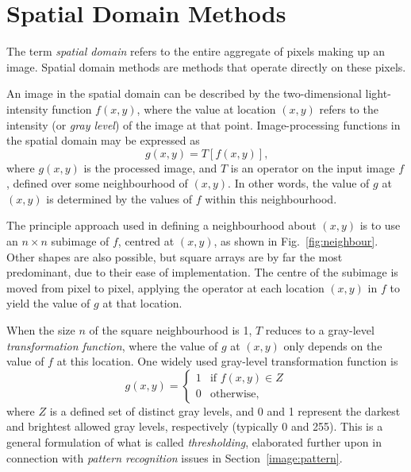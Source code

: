 
\section{Spatial Domain Methods}
\label{image:spatial}

The term {\em spatial domain\/} refers to the entire aggregate of
pixels making up an image.  Spatial domain methods are methods that
operate directly on these pixels.

An image in the spatial domain can be described by the two-dimensional
light-intensity function $f(x,y)$, where the value at location $(x,y)$
refers to the intensity (or {\em gray level\/}) of the image at that
point.  Image-processing functions in the spatial domain may be
expressed as
\begin{equation}
\label{eq:spatial_operator}
g(x,y)=T[f(x,y)]\mbox{,}
\end{equation}
where $g(x,y)$ is the processed image, and $T$ is an operator on the
input image $f$, defined over some neighbourhood of $(x,y)$.  In other
words, the value of $g$ at $(x,y)$ is determined by the values of $f$
within this neighbourhood.


The principle approach used in defining a neighbourhood about $(x,y)$
is to use an $n\times n$ subimage of $f$, centred at $(x,y)$, as shown
in Fig.~\ref{fig:neighbour}.  Other shapes are also
possible, but square arrays are by far the most predominant, due to
their ease of implementation.  The centre of the subimage is moved
from pixel to pixel, applying the operator at each location $(x,y)$
in $f$ to yield the value of $g$ at that location.

When the size $n$ of the square neighbourhood is 1, $T$ reduces to a
gray-level {\em transformation function\/}, where the value of $g$ at
$(x,y)$ only depends on the value of $f$ at this location.  One widely
used gray-level transformation function is
\begin{equation}
\label{eq:threshold}
g(x,y)=\left\{ \begin{array}{ll} 1 & \mbox{if $f(x,y)\in Z$} \\ 0 &
\mbox{otherwise,}
                 \end{array} \right.
\end{equation}
where $Z$ is a defined set of distinct gray levels, and 0 and 1
represent the darkest and brightest allowed gray levels, respectively
(typically 0 and 255).  This is a general formulation of what is
called {\em thresholding\/}, elaborated further upon in connection
with {\em pattern recognition\/} issues in
Section~\ref{image:pattern}.


